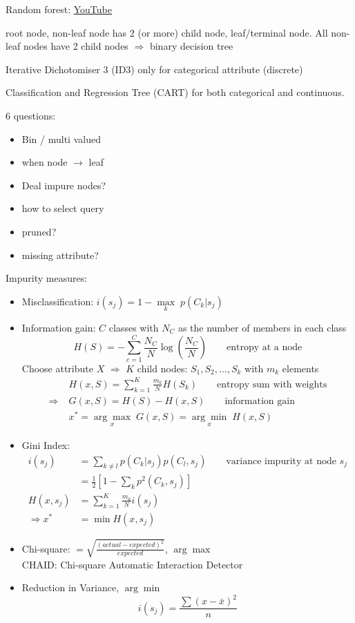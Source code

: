 Random forest: \href{https://www.youtube.com/watch?v=D_2LkhMJcfY}{YouTube}

 root node, non-leaf node has 2 (or more) child node, leaf/terminal node. All non-leaf nodes have 2 child nodes $\Rightarrow$ binary decision tree

Iterative Dichotomiser 3 (ID3) only for categorical attribute (discrete)

Classification and Regression Tree (CART) for both categorical and continuous.

6 questions:
\begin{itemize}
	\item Bin / multi valued
	\item when node $\rightarrow$ leaf
	\item Deal impure nodes?
	\item how to select query
	\item pruned?
	\item missing attribute?
\end{itemize}

Impurity measures:
\begin{itemize}
	\item Misclassification: $i(s_j) = 1 - \underset{k}{\max}\;p(C_k | s_j)$
	\item Information gain: $C$ classes with $N_C$ as the number of members in each class
	\begin{equation}
		H(S) = - \sum_{c=1}^{C} \frac{N_C}{N} \log \left(\frac{N_C}{N}\right) \qquad \text{entropy at a node}
	\end{equation}
	Choose attribute $X$ $\Rightarrow$ $K$ child nodes: $S_1, S_2, \dots, S_k$ with $m_k$ elements
	\begin{align}
		&H(x, S) =  \sum_{k=1}^{K} \frac{m_k}{N} H(S_k) \qquad \text{entropy sum with weights} \\
		\Rightarrow\; &G(x, S) = H(S) - H(x, S) \qquad \text{information gain}\\
		&x^* = \underset{x}{\arg\max}\;G(x, S) = \underset{x}{\arg\min}\;H(x, S)
	\end{align}
	\item Gini Index:
	\begin{align}
		i(s_j) &= \sum_{k \neq l} p(C_k | s_j) p(C_l, s_j) \qquad \text{variance impurity at node } s_j\\
		&= \frac{1}{2} \left[1- \sum_{k} p^2(C_k, s_j) \right]\\
		H(x, s_j) &= \sum_{k=1}^{K} \frac{m_k}{N} i(s_j)\\
		\Rightarrow x^* &= \min H(x, s_j)
	\end{align}
	\item Chi-square: $\displaystyle = \sqrt{\frac{(actual - expected)^2}{expected}}$, $\arg\max$\\
	CHAID: Chi-square Automatic Interaction Detector
	\item Reduction in Variance, $\arg\min$\\
	\begin{equation}
		i(s_j) = \frac{\sum (x-\bar{x})^2}{n}
	\end{equation}
\end{itemize}

